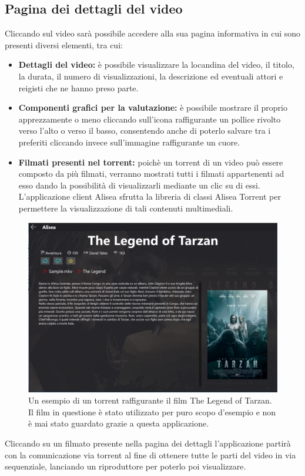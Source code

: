 \documentclass[a4]{book}
\begin{document}
\subsection{Pagina dei dettagli del video}
Cliccando sul video sarà possibile accedere alla sua pagina informativa in cui sono presenti diversi elementi, tra cui:
\begin{itemize}
	\item \textbf{Dettagli del video: }è possibile visualizzare la locandina del video, il titolo, la durata, il numero di visualizzazioni, la descrizione ed eventuali attori e reigisti che ne hanno preso parte.
	\item \textbf{Componenti grafici per la valutazione: }è possibile mostrare il proprio apprezzamente o meno cliccando sull'icona raffigurante un pollice rivolto verso l'alto o verso il basso, consentendo anche di poterlo salvare tra i preferiti cliccando invece sull'immagine raffigurante un cuore.
	\item \textbf{Filmati presenti nel torrent: }poichè un torrent di un video può essere composto da più filmati, verranno mostrati tutti i filmati appartenenti ad esso dando la possibilità di visualizzarli mediante un clic su di essi. L'applicazione client Alisea sfrutta la libreria di classi Alisea Torrent per permettere la visualizzazione di tali contenuti multimediali.\\
\end{itemize}
\begin{center}
	\begin{figure}[h!]
		\includegraphics[width=\textwidth]{filmdetail}
		\caption{Un esempio di un torrent raffigurante il film The Legend of Tarzan. Il film in questione è stato utilizzato per puro scopo d'esempio e non è mai stato guardato grazie a questa applicazione.\\}
	\end{figure}
\end{center}
Cliccando su un filmato presente nella pagina dei dettagli l'applicazione partirà con la comunicazione via torrent al fine di ottenere tutte le parti del video in via sequenziale, lanciando un riproduttore per poterlo poi visualizzare.
\newpage
\end{document}
